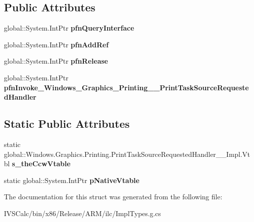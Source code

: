 \subsection*{Public Attributes}
\begin{DoxyCompactItemize}
\item 
\mbox{\label{struct_windows_1_1_graphics_1_1_printing_1_1_print_task_source_requested_handler_____impl_1_1_vtbl_ac925fba404fedec9dd60ee3c195109b0}} 
global\+::\+System.\+Int\+Ptr {\bfseries pfn\+Query\+Interface}
\item 
\mbox{\label{struct_windows_1_1_graphics_1_1_printing_1_1_print_task_source_requested_handler_____impl_1_1_vtbl_a96141ac8ee7aabfddd1594c3c4396797}} 
global\+::\+System.\+Int\+Ptr {\bfseries pfn\+Add\+Ref}
\item 
\mbox{\label{struct_windows_1_1_graphics_1_1_printing_1_1_print_task_source_requested_handler_____impl_1_1_vtbl_ad88ff02aceb49f89e4745d61a2af089d}} 
global\+::\+System.\+Int\+Ptr {\bfseries pfn\+Release}
\item 
\mbox{\label{struct_windows_1_1_graphics_1_1_printing_1_1_print_task_source_requested_handler_____impl_1_1_vtbl_a9222724a6013d83b6d20b6bb2991a1ed}} 
global\+::\+System.\+Int\+Ptr {\bfseries pfn\+Invoke\+\_\+\+Windows\+\_\+\+Graphics\+\_\+\+Printing\+\_\+\+\_\+\+Print\+Task\+Source\+Requested\+Handler}
\end{DoxyCompactItemize}
\subsection*{Static Public Attributes}
\begin{DoxyCompactItemize}
\item 
\mbox{\label{struct_windows_1_1_graphics_1_1_printing_1_1_print_task_source_requested_handler_____impl_1_1_vtbl_aa511d51b7aa2dd812c39e1de63c55a1c}} 
static global\+::\+Windows.\+Graphics.\+Printing.\+Print\+Task\+Source\+Requested\+Handler\+\_\+\+\_\+\+Impl.\+Vtbl {\bfseries s\+\_\+the\+Ccw\+Vtable}
\item 
\mbox{\label{struct_windows_1_1_graphics_1_1_printing_1_1_print_task_source_requested_handler_____impl_1_1_vtbl_a0afceaf763a0c44231bd0ea72272c3a9}} 
static global\+::\+System.\+Int\+Ptr {\bfseries p\+Native\+Vtable}
\end{DoxyCompactItemize}


The documentation for this struct was generated from the following file\+:\begin{DoxyCompactItemize}
\item 
I\+V\+S\+Calc/bin/x86/\+Release/\+A\+R\+M/ilc/Impl\+Types.\+g.\+cs\end{DoxyCompactItemize}

